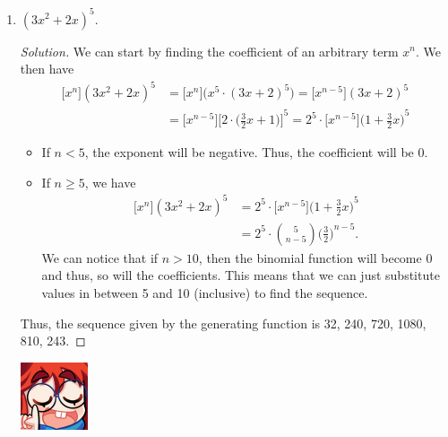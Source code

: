 \documentclass{article}
\newenvironment{solution}
  {\renewcommand\qedsymbol{$\blacksquare$}\begin{proof}[Solution]}
  {\end{proof}}
\begin{document}
\begin{enumerate}
\begin{solution}
\begin{itemize}
\[            \]
        \end{itemize} Thus, the sequence given by the generating function is 0, $-2$, 1, 1, 1, \ldots.   
    \end{solution}
    \item ${(3x^2 +2x)}^5$.\begin{solution}
        We can start by finding the coefficient of an arbitrary term $x^n$. We then have\begin{align*}
            \big[x^n\big] {(3x^2 +2x)}^5 &= \big[x^n\big] \big(x^5 \cdot {(3x +2)}^5 \big) = \big[x^{n-5}\big] {(3x +2)}^5 \\ 
            &= \big[x^{n-5}\big] {\Bigg[ 2\cdot \bigg(\frac{3}{2}x +1\bigg) \Bigg]}^5 = 2^5 \cdot \big[x^{n-5}\big] {\bigg(1+ \frac{3}{2}x\bigg)}^5
        \end{align*}\begin{itemize} 
            \item If $n <5$, the exponent will be negative. Thus, the coefficient will be 0. 
            \item If $n\geq 5$, we have\begin{align*}
                \big[x^n\big] {(3x^2 +2x)}^5 &= 2^5 \cdot \big[x^{n-5}\big] {\bigg(1+ \frac{3}{2}x\bigg)}^5 \\ 
                &= 2^5 \cdot \binom{5}{n-5} {\bigg(\frac{3}{2} \bigg)}^{n-5}. 
            \end{align*} We can notice that if $n>10$, then the binomial function will become 0 and thus, so will the coefficients. This means that we can 
            just substitute values in between 5 and 10 (inclusive) to find the sequence. 
        \end{itemize} Thus, the sequence given by the generating function is 32, 240, 720, 1080, 810, 243. 
    \end{solution}
    \begin{minipage}[t]{.14\textwidth}
        \vspace{0pt}
        \includegraphics[width=2cm]{nerd_maddy.png} 
    \end{minipage}%
\end{enumerate}
\end{document}
